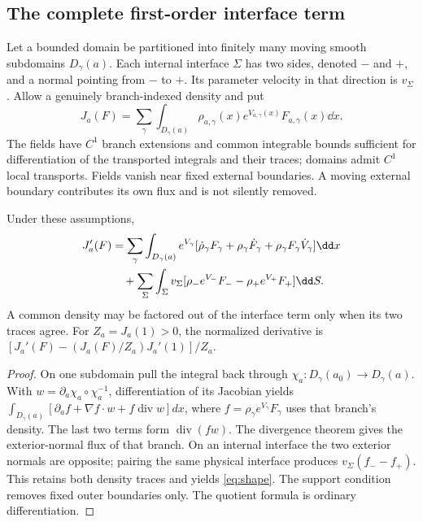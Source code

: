 \subsection{The complete first-order interface term}
Let a bounded domain be partitioned into finitely many moving smooth subdomains $D_\gamma(a)$. Each internal interface $\Sigma$ has two sides, denoted $-$ and $+$, and a normal pointing from $-$ to $+$. Its parameter velocity in that direction is $v_\Sigma$. Allow a genuinely branch-indexed density and put
\[
 J_a(F)=\sum_\gamma\int_{D_\gamma(a)}\rho_{a,\gamma}(x)e^{V_{a,\gamma}(x)}F_{a,\gamma}(x)\dd x.
\]
The fields have $C^1$ branch extensions and common integrable bounds sufficient for differentiation of the transported integrals and their traces; domains admit $C^1$ local transports. Fields vanish near fixed external boundaries. A moving external boundary contributes its own flux and is not silently removed.

\begin{theorem}\label{thm:shape}
Under these assumptions,
\begin{align}
 J_a'(F)
 &=\sum_\gamma\int_{D_\gamma(a)}e^{V_\gamma}
 [\dot\rho_\gamma F_\gamma+\rho_\gamma\dot F_\gamma+\rho_\gamma F_\gamma\dot V_\gamma]\dd x\notag\\
 &\quad+\sum_\Sigma\int_\Sigma v_\Sigma
 [\rho_-e^{V_-}F_- -\rho_+e^{V_+}F_+]\dd S.
 \label{eq:shape}
\end{align}
A common density may be factored out of the interface term only when its two traces agree. For $Z_a=J_a(1)>0$, the normalized derivative is
$[J_a'(F)-(J_a(F)/Z_a)J_a'(1)]/Z_a$.
\end{theorem}
\begin{proof}
On one subdomain pull the integral back through $\chi_a:D_\gamma(a_0)\to D_\gamma(a)$. With $w=\partial_a\chi_a\circ\chi_a^{-1}$, differentiation of its Jacobian yields
$\int_{D_\gamma(a)}[\partial_af+\nabla f\cdot w+f\operatorname{div}w]dx$,
where $f=\rho_\gamma e^{V_\gamma}F_\gamma$ uses that branch's density. The last two terms form $\operatorname{div}(fw)$. The divergence theorem gives the exterior-normal flux of that branch. On an internal interface the two exterior normals are opposite; pairing the same physical interface produces $v_\Sigma(f_--f_+)$. This retains both density traces and yields \eqref{eq:shape}. The support condition removes fixed outer boundaries only. The quotient formula is ordinary differentiation.
\end{proof}

